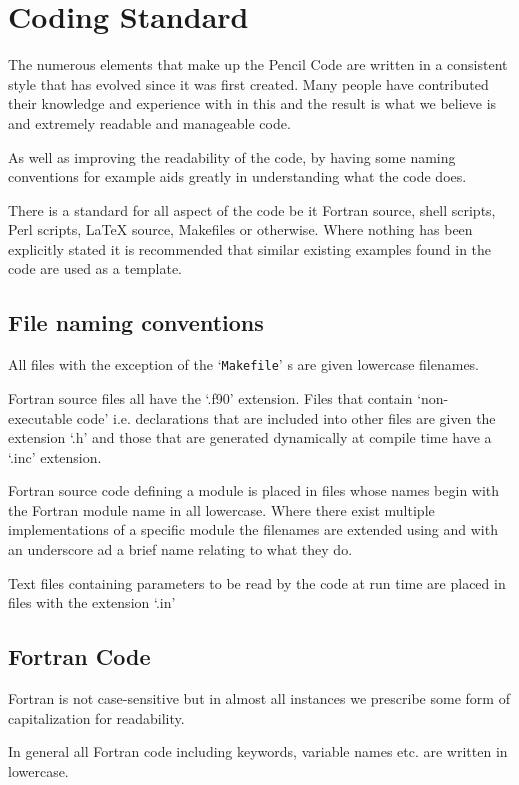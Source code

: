 \documentclass[\mydriver,12pt,twoside,notitlepage,a4paper]{article}
\makeatletter
\newcommand{\file}[2][]{%
  \def\index@{#1}%
  `\texttt{#2}'%
  \ifx\index@\@empty\index[file]{#2@\texttt{#2}}%
  \else\index[file]{#1@\texttt{#1}}%
  \fi%
}
\makeatother
\begin{document}
\section{Coding Standard}
\label{coding-standard}

The numerous elements that make up the {\sc Pencil Code} are written
in a consistent style that has evolved since it was first created.
Many people have contributed their knowledge and experience with
in this and the result is what we believe is and extremely
readable and manageable code.

As well as improving the readability of the code, by having some
naming conventions for example aids greatly in understanding what
the code does. 

There is a standard for all aspect of the code be it Fortran source,
shell scripts, Perl scripts, LaTeX source, Makefiles or otherwise.
Where nothing has been explicitly stated it is recommended that 
similar existing examples found in the code are used as a template.

\subsection{File naming conventions}
All files with the exception of the \file{Makefile}s are given
lowercase filenames. 

Fortran source files all have the `.f90' extension.  Files that
contain `non-executable code' i.e. declarations that are included into 
other files are given the extension `.h' and those that are generated 
dynamically at compile time have a `.inc' extension.

Fortran source code defining a module is placed in files whose names
begin with the Fortran module name in all lowercase.  Where there
exist multiple implementations of a specific module the filenames
are extended using and with an underscore ad a brief name relating
to what they do.

Text files containing parameters to be read by the code at run time are
placed in files with the extension `.in'


\subsection{Fortran Code}
Fortran is not case-sensitive but in almost all instances we prescribe
some form of capitalization for readability.

In general all Fortran code including keywords, variable names etc. are
written in lowercase. 
\end{document}
